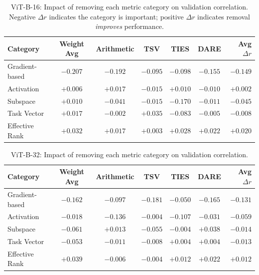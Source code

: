 \begin{table}[h]
\centering
\caption{ViT-B-16: Impact of removing each metric category on validation correlation. Negative $\Delta r$ indicates the category is important; positive $\Delta r$ indicates removal \emph{improves} performance.}
\label{tab:category_ablation_b16}
\begin{tabular}{@{}lcccccr@{}}
\toprule
\textbf{Category} & \textbf{Weight Avg} & \textbf{Arithmetic} & \textbf{TSV} & \textbf{TIES} & \textbf{DARE} & \textbf{Avg $\Delta r$} \\
\midrule
Gradient-based & $-0.207$ & $-0.192$ & $-0.095$ & $-0.098$ & $-0.155$ & $\mathbf{-0.149}$ \\
Activation & $+0.006$ & $+0.017$ & $-0.015$ & $+0.010$ & $-0.010$ & $+0.002$ \\
Subspace & $+0.010$ & $-0.041$ & $-0.015$ & $-0.170$ & $-0.011$ & $-0.045$ \\
Task Vector & $+0.017$ & $-0.002$ & $+0.035$ & $-0.083$ & $-0.005$ & $-0.008$ \\
Effective Rank & $+0.032$ & $+0.017$ & $+0.003$ & $+0.028$ & $+0.022$ & $\mathbf{+0.020}$ \\
\bottomrule
\end{tabular}
\end{table}

\begin{table}[h]
\centering
\caption{ViT-B-32: Impact of removing each metric category on validation correlation.}
\label{tab:category_ablation_b32}
\begin{tabular}{@{}lcccccr@{}}
\toprule
\textbf{Category} & \textbf{Weight Avg} & \textbf{Arithmetic} & \textbf{TSV} & \textbf{TIES} & \textbf{DARE} & \textbf{Avg $\Delta r$} \\
\midrule
Gradient-based & $-0.162$ & $-0.097$ & $-0.181$ & $-0.050$ & $-0.165$ & $\mathbf{-0.131}$ \\
Activation & $-0.018$ & $-0.136$ & $-0.004$ & $-0.107$ & $-0.031$ & $-0.059$ \\
Subspace & $-0.061$ & $+0.013$ & $-0.055$ & $-0.004$ & $+0.038$ & $-0.014$ \\
Task Vector & $-0.053$ & $-0.011$ & $-0.008$ & $+0.004$ & $+0.004$ & $-0.013$ \\
Effective Rank & $+0.039$ & $-0.006$ & $-0.004$ & $+0.012$ & $+0.022$ & $\mathbf{+0.012}$ \\
\bottomrule
\end{tabular}
\end{table}

